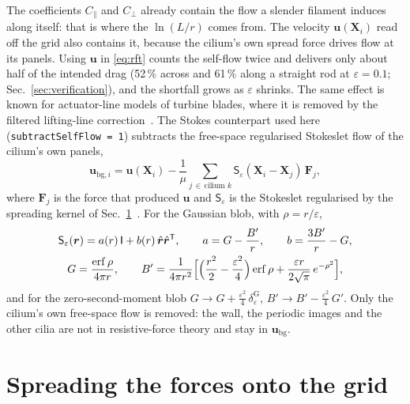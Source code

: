 \documentclass[10pt,a4paper]{article}
\newcommand{\vect}[1]{\bm{#1}}
\newcommand{\tens}[1]{\mathsf{#1}}
\newcommand{\eps}{\varepsilon}
\newcommand{\code}[1]{\texttt{#1}}
\begin{document}
The coefficients $C_\parallel$ and $C_\perp$ already contain the flow a slender filament induces along itself: that is where the $\ln(L/r)$ comes from.
The velocity $\vect u(\vect X_i)$ read off the grid also contains it, because the cilium's own spread force drives flow at its panels.
Using $\vect u$ in \eqref{eq:rft} counts the self-flow twice and delivers only about half of the intended drag (52\,\% across and 61\,\% along a straight rod at $\eps = 0.1$; Sec.~\ref{sec:verification}), and the shortfall grows as $\eps$ shrinks.
The same effect is known for actuator-line models of turbine blades, where it is removed by the filtered lifting-line correction~\cite{MartinezTossasMeneveau2019}.
The Stokes counterpart used here (\code{subtractSelfFlow = 1}) subtracts the free-space regularised Stokeslet flow of the cilium's own panels,
\begin{equation}
  \vect u_{\mathrm{bg},i} = \vect u(\vect X_i) - \frac{1}{\mu}\sum_{j\,\in\,\text{cilium }k} \tens S_\eps(\vect X_i - \vect X_j)\,\vect F_j ,
  \label{eq:selfflow}
\end{equation}
where $\vect F_j$ is the force that produced $\vect u$ and $\tens S_\eps$ is the Stokeslet regularised by the spreading kernel of Sec.~\ref{sec:spreading}~\cite{Cortez2001,CortezFauciMedovikov2005}.
For the Gaussian blob, with $\rho = r/\eps$,
\begin{gather}
  \tens S_\eps(\vect r) = a(r)\,\tens I + b(r)\,\hat{\vect r}\hat{\vect r}^{\mathsf T},
  \qquad a = G - \frac{B'}{r}, \qquad b = \frac{3B'}{r} - G, \\
  G = \frac{\operatorname{erf}\rho}{4\pi r},
  \qquad
  B' = \frac{1}{4\pi r^2}\Bigl[\Bigl(\frac{r^2}{2} - \frac{\eps^2}{4}\Bigr)\operatorname{erf}\rho + \frac{\eps r}{2\sqrt\pi}\,e^{-\rho^2}\Bigr],
\end{gather}
and for the zero-second-moment blob $G \to G + \tfrac{\eps^2}{4}\,\delta^{\mathrm{G}}_\eps$, $B' \to B' - \tfrac{\eps^2}{4}\,G'$.
Only the cilium's own free-space flow is removed: the wall, the periodic images and the other cilia are not in resistive-force theory and stay in $\vect u_\mathrm{bg}$.

\section{Spreading the forces onto the grid}
\label{sec:spreading}
\end{document}
